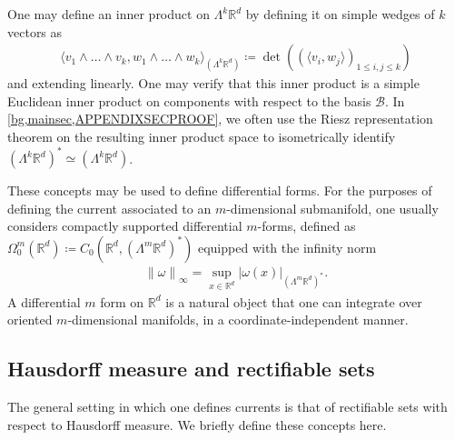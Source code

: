 \documentclass[sn-mathphys-num]{sn-jnl}%
\theoremstyle{thmstyleone}%
\theoremstyle{thmstyletwo}%
\theoremstyle{thmstylethree}%
\numberwithin{remark}{section}
\numberwithin{definition}{section}
\numberwithin{equation}{section}
\numberwithin{theorem}{section}
\newcommand{\norm}[1]{\left\lVert#1\right\rVert}
\newcommand{\R}{\ensuremath{\mathbb{R}}}%
\begin{document}
One may define an inner product on $\Lambda^{k}\R^{d}$ by defining it on simple wedges of $k$ vectors as
\begin{align}\label{exteriorinnerproddef}
    \langle v_{1}\wedge \dots \wedge v_{k},w_{1}\wedge \dots \wedge w_{k}\rangle_{(\Lambda^{k}\R^{d}) } \coloneq \det((\langle v_{i} ,w_{j}\rangle)_{1\leq i,j\leq k})
\end{align}
and extending linearly. One may verify that this inner product is a simple Euclidean inner product on components with respect to the basis $\mathcal{B}$. In \cref{bg,mainsec,APPENDIXSECPROOF}, we often use the Riesz representation theorem on the resulting inner product space to isometrically identify $(\Lambda^{k}\R^{d})^{*}\simeq (\Lambda^{k}\R^{d})$. 



These concepts may be used to define differential forms. For the purposes of defining the current associated to an $m$-dimensional submanifold, one usually considers compactly supported differential $m$-forms, defined as
$
  \Omega_{0}^{m}(\R^{d}) \coloneq C_{0}(\R^{d},(\Lambda^{m}\R^{d})^{*} )
$
equipped with the infinity norm 
\begin{align*}
    \norm{\omega}_{\infty} = \sup_{x\in \R^{d}}{\lvert \omega(x)\rvert}_{(\Lambda^{m}\R^{d})^{*}}. 
\end{align*}
A differential $m$ form on $\R^{d}$ is a natural object that one can integrate over oriented $m$-dimensional manifolds, in a coordinate-independent manner.

\subsection{Hausdorff measure and rectifiable sets}
The general setting in which one defines currents is that of rectifiable sets with respect to Hausdorff measure. We briefly define these concepts here.
\end{document}
